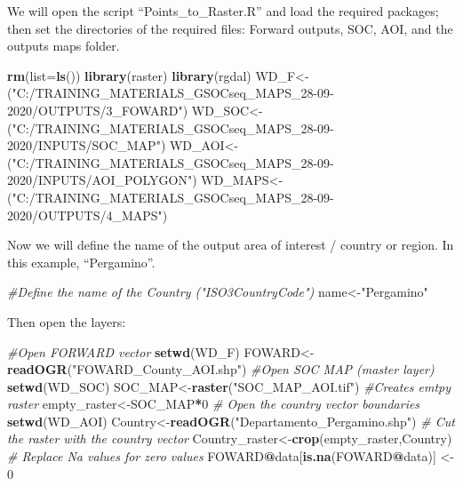 \documentclass[
  10pt,
  b5paper,
]{book}
\newenvironment{Shaded}{\begin{snugshade}}{\end{snugshade}}
\newcommand{\CommentTok}[1]{\textcolor[rgb]{0.56,0.35,0.01}{\textit{#1}}}
\newcommand{\DataTypeTok}[1]{\textcolor[rgb]{0.13,0.29,0.53}{#1}}
\newcommand{\DecValTok}[1]{\textcolor[rgb]{0.00,0.00,0.81}{#1}}
\newcommand{\KeywordTok}[1]{\textcolor[rgb]{0.13,0.29,0.53}{\textbf{#1}}}
\newcommand{\NormalTok}[1]{#1}
\newcommand{\OperatorTok}[1]{\textcolor[rgb]{0.81,0.36,0.00}{\textbf{#1}}}
\newcommand{\StringTok}[1]{\textcolor[rgb]{0.31,0.60,0.02}{#1}}
\begin{document}
We will open the script ``Points\_to\_Raster.R'' and load the required packages; then set the directories of the required files: Forward outputs, SOC, AOI, and the outputs maps folder.

\begin{Shaded}
\begin{Highlighting}[]
\KeywordTok{rm}\NormalTok{(}\DataTypeTok{list=}\KeywordTok{ls}\NormalTok{()) }
\KeywordTok{library}\NormalTok{(raster)}
\KeywordTok{library}\NormalTok{(rgdal)}
\NormalTok{WD_F<-(}\StringTok{"C:/TRAINING_MATERIALS_GSOCseq_MAPS_28-09-2020/OUTPUTS/3_FOWARD"}\NormalTok{)}
\NormalTok{WD_SOC<-(}\StringTok{"C:/TRAINING_MATERIALS_GSOCseq_MAPS_28-09-2020/INPUTS/SOC_MAP"}\NormalTok{)}
\NormalTok{WD_AOI<-(}\StringTok{"C:/TRAINING_MATERIALS_GSOCseq_MAPS_28-09-2020/INPUTS/AOI_POLYGON"}\NormalTok{)}
\NormalTok{WD_MAPS<-(}\StringTok{"C:/TRAINING_MATERIALS_GSOCseq_MAPS_28-09-2020/OUTPUTS/4_MAPS"}\NormalTok{)}
\end{Highlighting}
\end{Shaded}

Now we will define the name of the output area of interest / country or region. In this example, ``Pergamino''.

\begin{Shaded}
\begin{Highlighting}[]
\CommentTok{#Define the name of the Country ("ISO3CountryCode")}
\NormalTok{name<-}\StringTok{"Pergamino"} 
\end{Highlighting}
\end{Shaded}

Then open the layers:

\begin{Shaded}
\begin{Highlighting}[]
\CommentTok{#Open FORWARD vector}
\KeywordTok{setwd}\NormalTok{(WD_F)}
\NormalTok{FOWARD<-}\KeywordTok{readOGR}\NormalTok{(}\StringTok{"FOWARD_County_AOI.shp"}\NormalTok{)}
\CommentTok{#Open SOC MAP (master layer)}
\KeywordTok{setwd}\NormalTok{(WD_SOC)}
\NormalTok{SOC_MAP<-}\KeywordTok{raster}\NormalTok{(}\StringTok{"SOC_MAP_AOI.tif"}\NormalTok{)}
\CommentTok{#Creates emtpy raster }
\NormalTok{empty_raster<-SOC_MAP}\OperatorTok{*}\DecValTok{0}
\CommentTok{# Open the country vector boundaries}
\KeywordTok{setwd}\NormalTok{(WD_AOI)}
\NormalTok{Country<-}\KeywordTok{readOGR}\NormalTok{(}\StringTok{"Departamento_Pergamino.shp"}\NormalTok{)}
\CommentTok{# Cut the raster with the country vector}
\NormalTok{Country_raster<-}\KeywordTok{crop}\NormalTok{(empty_raster,Country)}
\CommentTok{# Replace Na values for zero values}
\NormalTok{FOWARD}\OperatorTok{@}\NormalTok{data[}\KeywordTok{is.na}\NormalTok{(FOWARD}\OperatorTok{@}\NormalTok{data)] <-}\StringTok{ }\DecValTok{0}
\end{Highlighting}
\end{Shaded}
\end{document}
